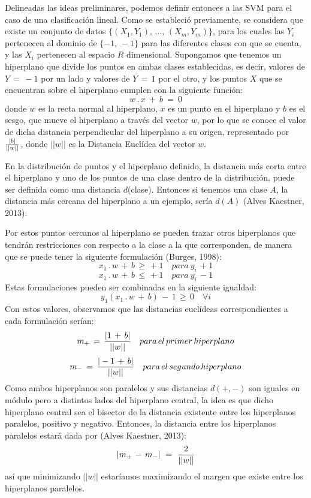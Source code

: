 {Delineadas las ideas preliminares, podemos definir entonces a las SVM para el caso de una clasificaci\'on lineal. Como se estableci\'o previamente, se considera que existe un conjunto de datos $\lbrace (X_{1},Y_{1}), \, \ldots, \, (X_{m},Y_{m}) \rbrace$, para los cuales las $Y_{i}$ pertenecen al dominio de $\lbrace -1, \, -1 \rbrace$ para las diferentes clases con que se cuenta, y las $X_{i}$ pertenecen al espacio $R$ dimensional. Supongamos que tenemos un hiperplano que divide los puntos en ambas clases establecidas, es decir, valores de $Y \, = \, -1$ por un lado y valores de $Y \, = \, 1$ por el otro, y los puntos $X$ que se encuentran sobre el hiperplano cumplen con la siguiente funci\'on:
$$
w \, . \, x \ + \ b \ = \ 0
$$ 
donde $w$ es la recta normal al hiperplano, $x$ es un punto en el hiperplano y $b$ es el sesgo, que mueve el hiperplano a trav\'es del vector $w$, por lo que se conoce el valor de dicha distancia perpendicular del hiperplano a su origen, representado por ${|b| \over ||w||}$, donde $||w||$ es la Distancia Eucl\'idea del vector $w$.
\newline

En la distribuci\'on de puntos y el hiperplano definido, la distancia m\'as corta entre el hiperplano y uno de los puntos de una clase dentro de la distribuci\'on, puede ser definida como una distancia $d$(clase). Entonces si tenemos una clase $A$, la distancia m\'as cercana del hiperplano a un ejemplo, ser\'ia $d(A)$ (Alves Kaestner, 2013).
\newline

Por estos puntos cercanos al hiperplano se pueden trazar otros hiperplanos que tendr\'an restricciones con respecto a la clase a la que corresponden, de manera  que se puede tener la siguiente formulaci\'on (Burges, 1998):
$$
x_{1} \, . \, w \, + \, b \, \ge \, +1 \quad para \ y_{i} \, +1 $$
$$
x_{1} \, . \, w \, + \, b \, \le \, +1 \quad para \ y_{i} \, -1
$$
Estas formulaciones pueden ser combinadas en la siguiente igualdad:
$$
y_{1}(x_{1} \, . \, w \, + \, b) \, - \, 1 \, \ge \, 0	\quad \forall i
$$
Con estos valores, observamos que las distancias eucl\'ideas correspondientes a cada formulaci\'on ser\'ian: 
$$ 
m_{+} \, = \, {|1 \, + \, b| \over ||w||} \quad para \, el \, primer \, hiperplano $$
$$ 
m_{-} \, = \, {|-1 \, + \, b| \over ||w||} \quad para \, el \, segundo \, hiperplano
$$
Como ambos hiperplanos son paralelos y sus distancias $d(+,-)$ son iguales en m\'odulo pero a distintos lados del hiperplano central, la idea es que dicho hiperplano central sea el bisector de la distancia existente entre los hiperplanos paralelos, positivo y negativo. Entonces, la distancia entre los hiperplanos paralelos estar\'a dada por (Alves Kaestner, 2013):
$$
|m_{+} \, - \, m_{-}| \ = \ {2 \over ||w||}
$$
as\'i que minimizando $||w||$ estar\'iamos maximizando el margen que existe entre los hiperplanos paralelos.
\newline

}
